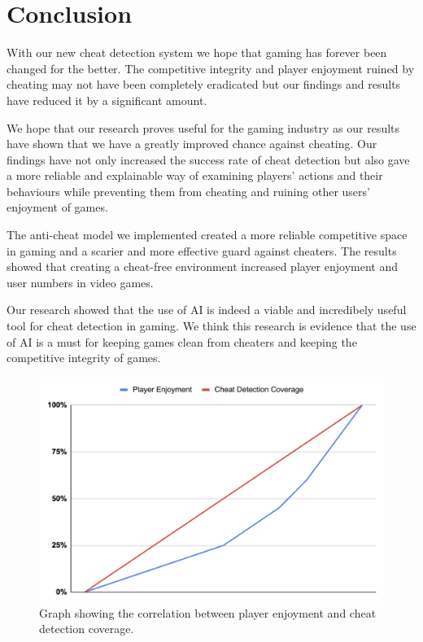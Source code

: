 \section{Conclusion}
\label{ch:conclusion}

With our new cheat detection system we hope that gaming has forever been changed for the better. The competitive integrity and player enjoyment ruined by cheating may not have been completely eradicated but our findings and results have reduced it by a significant amount. 

We hope that our research proves useful for the gaming industry as our results have shown that we have a greatly improved chance against cheating. Our findings have not only increased the success rate of cheat detection but also gave a more reliable and explainable way of examining players' actions and their behaviours while preventing them from cheating and ruining other users' enjoyment of games.

The anti-cheat model we implemented created a more reliable competitive space in gaming and a scarier and more effective guard against cheaters. The results showed that creating a cheat-free environment increased player enjoyment and user numbers in video games.

Our research showed that the use of AI is indeed a viable and incredibely useful tool for cheat detection in gaming. We think this research is evidence that the use of AI is a must for keeping games clean from cheaters and keeping the competitive integrity of games.

\begin{figure}[h]
  \centering
  \includegraphics[width=0.6\linewidth]{contents/images/enjoyment.jpeg}
  \captionsetup{width=0.6\textwidth}
  \caption{\label{fig:purpose}Graph showing the correlation between player enjoyment and cheat detection coverage.}
  \end{figure}